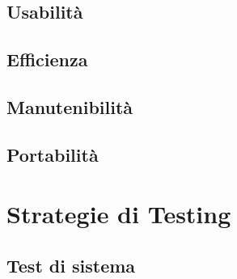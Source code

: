 \documentclass[10pt, letterpaper]{article}
\begin{document}
\begin{table}[H]
    \subsection{Usabilità}
    \caption{Tabella dei valori soglia per metriche di usabilità}
\end{table}

\begin{table}[H]
    \subsection{Efficienza}
    \caption{Tabella dei valori soglia per metriche di efficienza}
\end{table}

\begin{table}[H]
    \subsection{Manutenibilità}
    \caption{Tabella dei valori soglia per metriche di manutenibilità}
\end{table}

\begin{table}[H]
    \subsection{Portabilità}
    \caption{Tabella dei valori soglia per metriche di portabilità}
\end{table}

\section{Strategie di Testing}
\subsection{Test di sistema}
\end{document}
